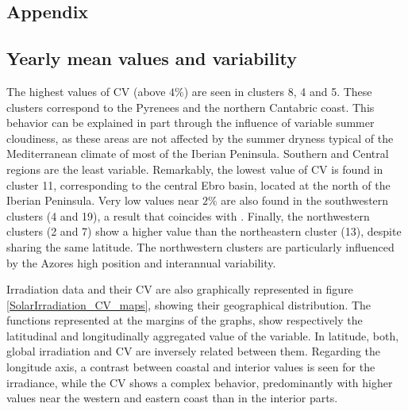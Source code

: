 \begin{subappendices}

\section{Appendix}

\subsection{Yearly mean values and variability}

The highest values of CV (above $4\%$) are seen in clusters 8, 4 and 5. These clusters correspond to the Pyrenees and the northern Cantabric coast. This behavior can be explained in part through the influence of variable summer cloudiness, as these areas are not affected by the summer dryness typical of the Mediterranean climate of most of the Iberian Peninsula. Southern and Central regions are the least variable. Remarkably, the lowest value of CV is found in cluster 11, corresponding to the central Ebro basin, located at the north of the Iberian Peninsula. Very low values near $2\%$   are also found in the southwestern clusters (4 and 19), a result that coincides with \cite{Gil2015}. Finally, the northwestern clusters (2 and 7) show a higher value than the northeastern cluster (13), despite sharing the same latitude. The northwestern clusters are particularly influenced by the Azores high position and interannual variability.

Irradiation data and their CV are also graphically represented in figure \ref{SolarIrradiation_CV_maps}, showing their geographical distribution. The functions represented at the margins of the graphs, show respectively the latitudinal and longitudinally aggregated value of the variable. In latitude, both, global irradiation and CV are inversely related between them. Regarding the longitude axis, a contrast between coastal and interior values is seen for the irradiance, while the CV shows a complex behavior, predominantly with higher values near the western and eastern coast than in the interior parts.


\end{subappendices}

